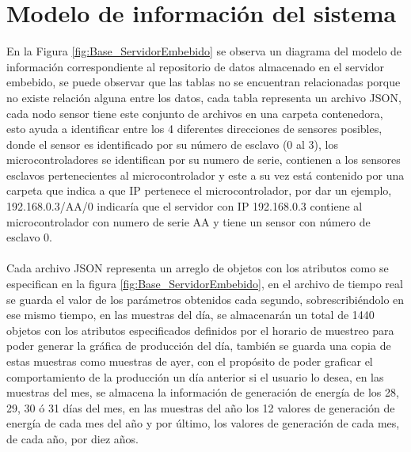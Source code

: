 \section{Modelo de información del sistema}
En la Figura \ref{fig:Base_ServidorEmbebido} se observa un diagrama del modelo de información correspondiente al repositorio de datos almacenado en el servidor embebido, se puede observar que las tablas no se encuentran relacionadas porque no existe relación alguna entre los datos, cada tabla representa un archivo JSON, cada nodo sensor tiene este conjunto de archivos en una carpeta contenedora, esto ayuda a identificar entre los 4 diferentes direcciones de sensores posibles, donde el sensor es identificado por su número de esclavo (0 al 3), los microcontroladores se identifican por su numero de serie, contienen a los sensores esclavos pertenecientes al microcontrolador y este a su vez está contenido por una carpeta que indica a que IP pertenece el microcontrolador, por dar un ejemplo, 192.168.0.3/AA/0 indicaría que el servidor con IP 192.168.0.3 contiene al microcontrolador con numero de serie AA y tiene un sensor con número de esclavo 0. 
\paragraph{}
Cada archivo JSON representa un arreglo de objetos con los atributos como se especifican en la figura \ref{fig:Base_ServidorEmbebido}, en el archivo de tiempo real se guarda el valor de los parámetros obtenidos cada segundo, sobrescribiéndolo en ese mismo tiempo, en las muestras del día, se almacenarán un total de 1440 objetos con los atributos especificados definidos por el horario de muestreo para poder generar la gráfica de producción del día, también se guarda una copia de estas muestras como muestras de ayer, con el propósito de poder graficar el comportamiento de la producción un día anterior si el usuario lo desea, en las muestras del mes, se almacena la información de generación de energía de los 28, 29, 30 ó 31 días del mes, en las muestras del año los 12 valores de generación de energía de cada mes del año y por último, los valores de generación de cada mes, de cada año, por diez años.

